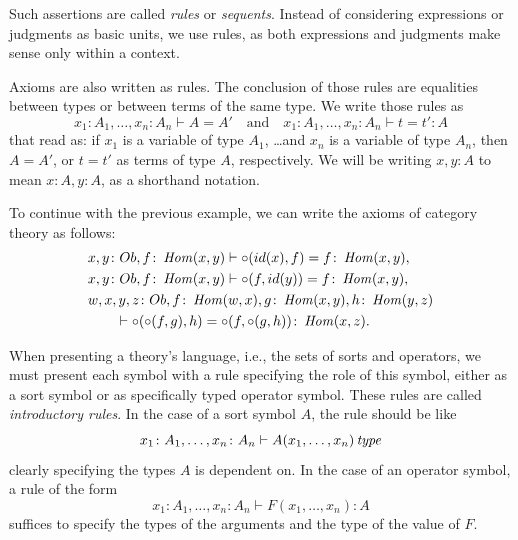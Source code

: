 Such assertions are called \textit{rules} or \textit{sequents}. 
Instead of considering expressions or judgments as basic units, we use rules, 
as both expressions and judgments make sense only within a context.

Axioms are also written as rules. The conclusion of those rules
are equalities between types or between terms of the same type.
We write those rules as 
\begin{equation*}
     x_1 \colon A_1, \dots, x_n \colon A_n \vdash A = A'
     \quad \text{and} \quad
     x_1 \colon A_1, \dots, x_n \colon A_n \vdash t = t' \colon A
\end{equation*}
that read as: if $x_1$ is a variable of type $A_1$, \dots and $x_n$ is a variable of type $A_n$,
then $A = A'$, or $t = t'$ as terms of type $A$, respectively.
We will be writing $x, y \colon A$ to mean $x \colon A, y \colon A$, as a shorthand notation.

To continue with the previous example, we can write the axioms
of category theory as follows:
\begin{alignat*}{2}
    &x, y \colon Ob, f \colon \operatorname{\mathit{Hom}}(x, y)  \vdash  \circ(id(x), f) = f \colon \operatorname{\mathit{Hom}}(x, y), \\
    &x, y \colon Ob, f \colon \operatorname{\mathit{Hom}}(x, y)  \vdash  \circ(f, id(y)) = f \colon \operatorname{\mathit{Hom}}(x, y), \\
    &w, x, y, z \colon Ob, f \colon \operatorname{\mathit{Hom}}(w, x), g \colon \operatorname{\mathit{Hom}}(x, y), h \colon \operatorname{\mathit{Hom}}(y, z) \\ 
        &\qquad\vdash \circ(\circ(f, g), h) = \circ(f, \circ(g, h)) \colon \operatorname{\mathit{Hom}}(x, z).
\end{alignat*}

When presenting a theory's language, i.e., the sets of sorts and operators,
we must present each symbol with a rule specifying the role
of this symbol, either as a sort symbol or as specifically typed operator symbol. 
These rules are called \textit{introductory rules}.
In the case of a sort symbol $A$, the rule should be like 
\begin{equation*}
    x_1 \colon A_1, \dots, x_n \colon A_n \vdash A(x_1, \dots, x_n) \operatorname{\mathit{\space type}}
\end{equation*}
clearly specifying the types $A$ is dependent on.
In the case of an operator symbol, a rule of the form
\begin{equation*}
    x_1 \colon A_1, \dots, x_n \colon A_n \vdash F(x_1, \dots, x_n) \colon A
\end{equation*}
suffices to specify the types of the arguments and the type of the value of $F$.

